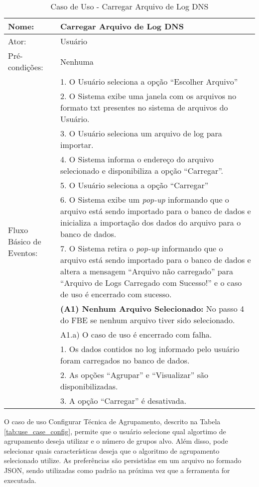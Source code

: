 \begin{table}[]
\centering
\caption{Caso de Uso - Carregar Arquivo de Log DNS}
\label{tab:use_case_load_file}
\begin{tabular}{|lp{10cm}|}
\hline
Nome: & Carregar Arquivo de Log DNS  \\ \hline
Ator: & Usuário   \\ \hline
Pré-condições: & Nenhuma   \\ \hline
\multirow{15}{*}{Fluxo Básico de Eventos:} & 1. O Usuário seleciona a opção ``Escolher Arquivo''  \\
 & 2. O Sistema exibe uma janela com os arquivos no formato txt presentes no sistema de arquivos do Usuário.  \\
 & 3. O Usuário seleciona um arquivo de log para importar.  \\
 & 4. O Sistema informa o endereço do arquivo selecionado e disponibiliza a opção ``Carregar''. \\
 & 5. O Usuário seleciona a opção ``Carregar'' \\
 & 6. O Sistema exibe um \textit{pop-up} informando que o arquivo está sendo importado para o banco de dados e inicializa a importação dos dados do arquivo para o banco de dados. \\
 & 7. O Sistema retira o \textit{pop-up} informando que o arquivo está sendo importado para o banco de dados e altera a mensagem ``Arquivo não carregado'' para ``Arquivo de Logs Carregado com Sucesso!'' e o caso de uso é encerrado com sucesso.\\ \hline
\multirow{3}{*}{Fluxo Alternativo de Eventos:} & \textbf{(A1) Nenhum Arquivo Selecionado:} No passo 4 do FBE se nenhum arquivo tiver sido selecionado.\\
 & A1.a) O caso de uso é encerrado com falha.\\ \hline
\multirow{5}{*}{Pós-Condições:} & 1. Os dados contidos no log informado pelo usuário foram carregados no banco de dados. \\
 & 2. As opções ``Agrupar'' e ``Visualizar'' são disponibilizadas.\\
 & 3. A opção ``Carregar'' é desativada.\\
\hline 
\end{tabular}
\end{table}

O caso de uso Configurar Técnica de Agrupamento, descrito na Tabela \ref{tab:use_case_config}, permite que o usuário selecione qual algortimo de agrupamento deseja utilizar e o número de grupos alvo. Além disso, pode selecionar quais características deseja que o algoritmo de agrupamento selecionado utilize. As preferências são persistidas em um arquivo no formado JSON, sendo utilizadas como padrão na próxima vez que a ferramenta for executada.


